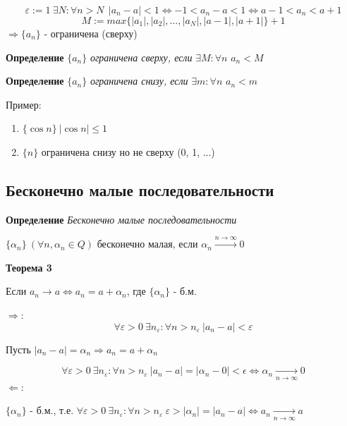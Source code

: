\documentclass[12pt, a4paper]{article}
\newcommand{\eps}{\varepsilon}
\begin{document}
\begin{tcolorbox}[title=Доказательство Т2, breakable]
\[\eps := 1\ \exists N: \forall n > N\ \ |a_n-a| < 1 \Leftrightarrow -1<a_n-a<1 \Leftrightarrow a-1 < a_n < a+1  \]
\[ M:= max\{ |a_1|, |a_2|, ..., |a_N|, |a-1|, |a+1| \} + 1\]
$\Rightarrow \{a_n\}$ - ограничена (сверху)
\end{tcolorbox}

\begin{tcolorbox}
\textbf{Определение}
$\{a_n\}$  \textit{ограничена сверху, если} $\exists M: \forall n$ $a_n < M$
\end{tcolorbox}

\begin{tcolorbox}
\textbf{Определение}
$\{a_n\}$  \textit{ограничена снизу, если} $\exists m: \forall n$ $a_n < m$
\end{tcolorbox}

Пример:
\begin{enumerate}
    \item $\{\cos n\}\ |\cos n| \leq 1$
    \item $\{n\}$ ограничена снизу но не сверху (0, 1, ...)
\end{enumerate}

\newpage
\subsection{Бесконечно малые последовательности}

\begin{tcolorbox}
\textbf{Определение}
\textit{Бесконечно малые последовательности}
\begin{center}
    $\{\alpha_n\}\ (\forall n, \alpha_n \in Q)$ бесконечно малая, если $\alpha_n 
    \xrightarrow{n\rightarrow \infty} 0$    
\end{center}
\end{tcolorbox}

\begin{tcolorbox}
\textbf{Теорема 3} 
\begin{center}
    Если $a_n \rightarrow a \Leftrightarrow a_n = a + \alpha_n$, где $ \{\alpha_n\}$ - б.м.
\end{center}
\end{tcolorbox}

\begin{tcolorbox}[title=Доказательство Т3]
$\Rightarrow$:\\
\[ \forall \eps>0\ \exists n_\eps : \forall n > n_\eps\ |a_n - a| < \eps \]
\begin{center}
    Пусть $ |a_n-a| = \alpha_n \Rightarrow a_n = a + \alpha_n $    
\end{center}
\[ \forall \eps > 0\ \exists n_\eps: \forall n > n_\eps\  |a_n -a| = |\alpha_n - 0| < \epsilon \Leftrightarrow \alpha_n \xrightarrow[n\rightarrow \infty]{} 0 \]
$\Leftarrow$:\\
\begin{center}
    $ \{\alpha_n \} $ - б.м., т.е. $ \forall \eps>0\ \exists n_\eps : \forall n > n_\eps\ \eps > |\alpha_n| = |a_n-a| \Leftrightarrow a_n \xrightarrow[n \rightarrow \infty]{} a$    
\end{center}
\end{tcolorbox}
\end{document}
